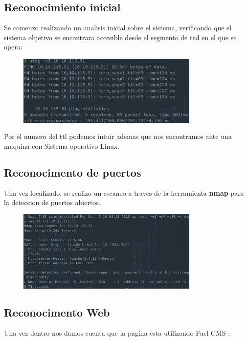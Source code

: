 \documentclass[a4paper]{article}%
\begin{document}
	\subsection{Reconocimiento inicial}

	\vspace{0.2cm}
	Se comenzo realizando un analisis inicial sobre el sistema, verificando que el sistema
	objetivo se encontrara accesible desde el segmento de red en el que se opera:

	\begin{figure}[h]
	\includegraphics[width=0.8\textwidth]{images/ping.jpg}
	\end{figure}

	\vspace{0.2cm}

	Por el numero del ttl podemos intuir ademas que nos encontramos 
	ante una maquina con Sistema operativo Linux.
	\clearpage
	
	\subsection{Reconocimento de puertos}
	
	Una vez localizado, se realizo un escaneo a traves de la herramienta \textbf{nmap}
	para la deteccion de puertos abiertos.

	\begin{figure}[h]
	\includegraphics[width=0.8\textwidth]{images/nmap_comun.jpg}
	\end{figure}

	\subsection{Reconocimento Web}
	Una vez dentro nos damos cuenta que la pagina esta utilizando Fuel 
	CMS :
	
\end{document}
